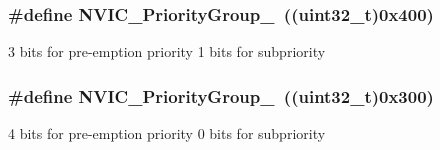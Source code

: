 \subsubsection[{N\+V\+I\+C\+\_\+\+Priority\+Group\+\_\+3}]{\setlength{\rightskip}{0pt plus 5cm}\#define N\+V\+I\+C\+\_\+\+Priority\+Group\+\_~((uint32\+\_\+t)0x400)}\label{group___m_i_s_c___preemption___priority___group_ga49bdbee77d4a70339d63c80462d49b4d}
3 bits for pre-\/emption priority 1 bits for subpriority \hypertarget{group___m_i_s_c___preemption___priority___group_gaf9020c585da2a299328f0b06dee391a2}{}
\subsubsection[{N\+V\+I\+C\+\_\+\+Priority\+Group\+\_\+4}]{\setlength{\rightskip}{0pt plus 5cm}\#define N\+V\+I\+C\+\_\+\+Priority\+Group\+\_~((uint32\+\_\+t)0x300)}\label{group___m_i_s_c___preemption___priority___group_gaf9020c585da2a299328f0b06dee391a2}
4 bits for pre-\/emption priority 0 bits for subpriority 